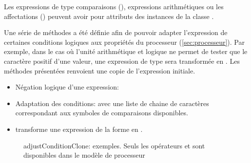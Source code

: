 Les expressions de type comparaisons (), expressions arithmétiques  ou les affectations () peuvent avoir pour attributs des instances de la classe .


Une série de méthodes a été définie afin de pouvoir adapter l'expression de certaines conditions logiques aux propriétés du processeur (\ref{sec:processeur}). Par exemple, dans le cas où l'unité arithmétique et logique ne permet de tester que le caractère positif d'une valeur, une expression de type  sera transformée en . Les méthodes présentées renvoient une copie de l'expression initiale.

\begin{itemize}
	\item Négation logique d'une expression: 
	\item Adaptation des conditions:  avec  une liste de chaine de caractères correspondant aux symboles de comparaisons disponibles.

	\item {} transforme une expression de la forme  en .  
\end{itemize}
\begin{figure}[h!]
	\centering
	
	\caption{adjustConditionClone: exemples. Seuls les opérateurs \pyinline{<} et \pyinline{==} sont disponibles dans le modèle de processeur}
\end{figure}